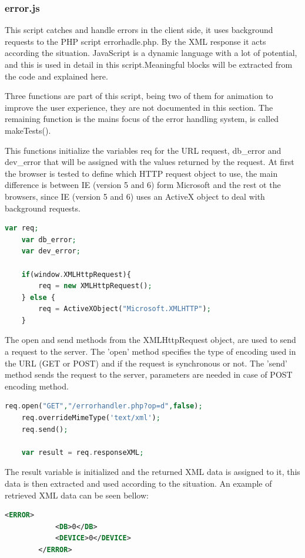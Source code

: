 \subsubsection{error.js}
This script catches and handle errors in the client side, it uses background requests to the PHP script errorhadle.php. By the XML response it acts according the situation. JavaScript is a dynamic language with a lot of potential, and this is used in detail in this script.Meaningful blocks will be extracted from the code and explained here.

Three functions are part of this script, being two of them for animation to improve the user experience, they are not documented in this section. The remaining function is the mains focus of the error handling system, is called makeTests().

This functions initialize the variables req for the URL request, db\_error and dev\_error that will be assigned with the values returned by the request.
At first the browser is tested to define which HTTP request object to use, the main difference is between IE (version 5 and 6) form Microsoft and the rest ot the browsers, since IE (version 5 and 6) uses an ActiveX object to deal with background requests.
\begin{lstlisting}[language=php]
	var req;
	var db_error;
	var dev_error;
	
	if(window.XMLHttpRequest){
		req	= new XMLHttpRequest();
	} else {
		req = ActiveXObject("Microsoft.XMLHTTP");	
	}
\end{lstlisting}

The open and send methods from the XMLHttpRequest object, are used to send a request to the server. The 'open' method specifies the type of encoding used in the URL (GET or POST) and if the request is synchronous or not. The 'send' method sends the request to the server, parameters are needed in case of POST encoding method. 

\begin{lstlisting}[language=php]
	req.open("GET","/errorhandler.php?op=d",false);
	req.overrideMimeType('text/xml');
	req.send();
	
	var result = req.responseXML;
\end{lstlisting}

The result variable is initialized and the returned XML data is assigned to it, this data is then extracted and used according to the situation. An example of retrieved XML data can be seen bellow:

\begin{lstlisting}[language=xml]
		<ERROR>
			<DB>0</DB>
			<DEVICE>0</DEVICE>
		</ERROR>
\end{lstlisting}


